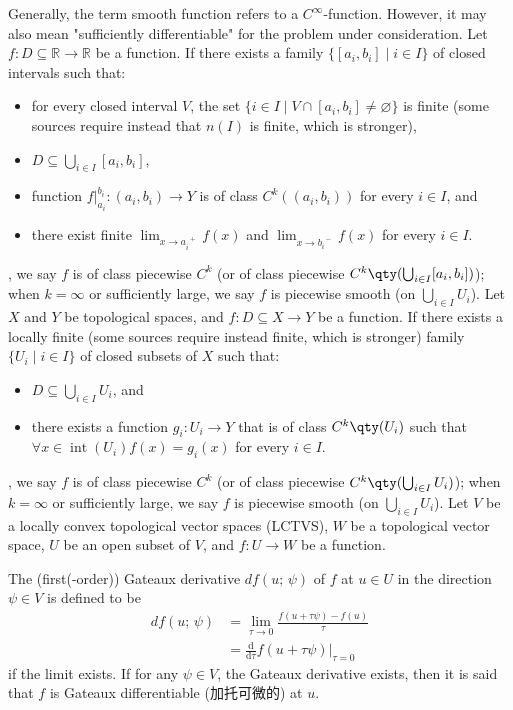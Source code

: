\documentclass[a4paper,12pt]{report}
\begin{document}
Generally, the term smooth function refers to a $C^{\infty}$-function. However, it may also mean "sufficiently differentiable" for the problem under consideration.
Let $f\colon D\subseteq\mathbb{R}\to\mathbb{R}$ be a function. If there exists a family $\{[a_i,b_i]\mid i\in I\}$ of closed intervals such that:
\begin{itemize}
\item for every closed interval $V$, the set $\{i\in I\mid V\cap [a_i,b_i]\neq\varnothing\}$ is finite (some sources require instead that $n(I)$ is finite, which is stronger),
\item $D\subseteq\bigcup_{i\in I}[a_i,b_i]$,
\item function $f\big\vert_{a_i}^{b_i}\colon(a_i,b_i)\to Y$ is of class $C^k((a_i,b_i))$ for every $i\in I$, and
\item there exist finite $\lim_{x\to a_i^{\phantom{i}+}}f(x)$ and $\lim_{x\to b_i^{\phantom{i}-}}f(x)$ for every $i\in I$.
\end{itemize},
we say $f$ is of class piecewise $C^k$ (or of class piecewise $C^k\qty(\bigcup_{i\in I}[a_i,b_i])$); when $k=\infty$ or sufficiently large, we say $f$ is piecewise smooth (on $\bigcup_{i\in I}U_i$).
Let $X$ and $Y$ be topological spaces, and $f\colon D\subseteq X\to Y$ be a function. If there exists a locally finite (some sources require instead finite, which is stronger) family $\{U_i\mid i\in I\}$ of closed subsets of $X$ such that:
\begin{itemize}
\item $D\subseteq\bigcup_{i\in I}U_i$, and
\item there exists a function $g_i\colon U_i\to Y$ that is of class $C^k\qty(U_i)$ such that $\forall x\in\operatorname{int}\left(U_i\right)f(x)=g_i(x)$ for every $i\in I$.
\end{itemize},
we say $f$ is of class piecewise $C^k$ (or of class piecewise $C^k\qty(\bigcup_{i\in I}U_i)$); when $k=\infty$ or sufficiently large, we say $f$ is piecewise smooth (on $\bigcup_{i\in I}U_i$).
Let $V$ be a locally convex topological vector spaces (LCTVS), $W$ be a topological vector space, $U$ be an open subset of $V$, and $f\colon U\to W$ be a function.

The (first(-order)) Gateaux derivative $df(u;\,\psi)$ of $f$ at $u\in U$ in the direction $\psi \in V$ is defined to be
\[\begin{aligned}
df(u;\,\psi) &= \lim_{\tau\to 0}\frac{f(u+\tau \psi)-f(u)}{\tau}\\
&= \frac{\mathrm{d}}{\mathrm{d}\tau}f(u+\tau \psi)\big\vert_{\tau =0}
\end{aligned}\]
if the limit exists. If for any $\psi \in V$, the Gateaux derivative exists, then it is said that $f$ is Gateaux differentiable (加托可微的) at $u$.
\end{document}
